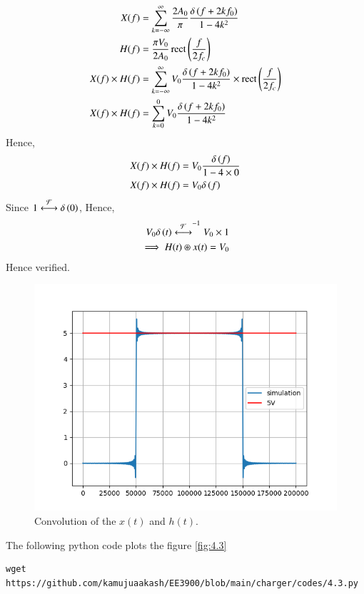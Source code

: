 \documentclass[journal,12pt,twocolumn]{IEEEtran}
\renewcommand\thesection{\arabic{section}}
\begin{document}
\begin{enumerate}[label=\thesection.\arabic*
	,ref=\thesection.\theenumi]
	\begin{align}
		X(f)&=\sum_{k=-\infty}^{\infty} \frac{2A_0}{\pi} \frac{\delta\left(f+2kf_0\right)}{1-4k^2}\\
		H(f)&=\frac{\pi V_0}{2A_0}\mathop{\mathrm{rect}}{\left(\frac{f}{2f_c}\right)}\\
		X(f) \times H(f)&=\sum_{k=-\infty}^{\infty} V_0 \frac{\delta\left(f+2kf_0\right)}{1-4k^2} \times \mathop{\mathrm{rect}}{\left(\frac{f}{2f_c}\right)}\\
		X(f)\times H(f)&=\sum_{k=0}^{0} V_0 \frac{\delta\left(f+2kf_0\right)}{1-4k^2}
	\end{align} 
	Hence,
	\begin{align}
		X(f)\times H(f)&=V_0 \frac{\delta\left(f\right)}{1-4 \times 0}\\
		X(f)\times H(f)&=V_0 \delta\left(f\right)
	\end{align} 
Since $1\overset{\mathcal{F}}{ \longleftrightarrow} \delta\left(0\right)$,
Hence, 
\begin{align}
V_0 \delta\left(t\right) \overset{\mathcal{F}}{ \longleftrightarrow}^{-1} V_0\times 1	\\
\implies H(t) \circledast x(t)=V_0
\end{align}
Hence verified.
	\begin{figure}[!ht]
			\includegraphics[width=\columnwidth]{figs/4.3.png}
			\caption{Convolution of the $x(t)$ and $h(t)$.}
			\label{eq:fig:4.3}
		\end{figure}
The following python code plots the figure \ref{fig:4.3}
\begin{lstlisting}
wget https://github.com/kamujuaakash/EE3900/blob/main/charger/codes/4.3.py
\end{lstlisting} 
\end{enumerate}
\end{document}
